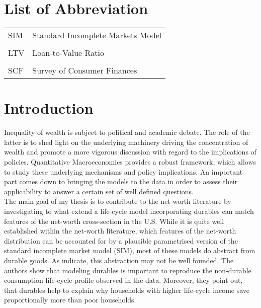 \documentclass[a4paper,12pt,legno]{article}
\begin{document}
 \newpage
\thispagestyle{empty}
\listoffigures

 \newpage
 
	\thispagestyle{empty}
	\section*{List of Abbreviation}
	
	\begin{table}[!htbp]
		\centering
	\begin{flushleft}  
	   \begin{tabular}{ll}
	    SIM   & Standard Incomplete Markets Model \\ \\
	    LTV   & Loan-to-Value Ratio \\ \\
	    SCF	  & Survey of Consumer Finances \\
	    \end{tabular}%
	\end{flushleft}
	\end{table}%
	\newpage



\setcounter{page}{1}        %


\section{Introduction}
\label{Introduction}

Inequality of wealth is subject to political and academic debate. The role of the latter is to shed light on the underlying machinery driving the concentration of wealth and promote a more vigorous discussion with regard to the implications of policies. Quantitative Macroeconomics provides a robust framework, which allows to study these underlying mechanisms and policy implications. An important part comes down to bringing the models to the data in order to assess their applicability to answer a certain set of well defined questions. \\
The main goal of my thesis is to contribute to the net-worth literature by investigating to what extend a life-cycle model incorporating durables can match features of the net-worth cross-section in the U.S. While it is quite well established within the net-worth literature, which features of the net-worth distribution can be accounted for by a plausible parametrised version of the standard incomplete market model (SIM), most of these models do abstract from durable goods. As \cite{FV&K2011}  indicate, this abstraction may not be well founded. The authors show that modeling durables is important to reproduce the non-durable consumption life-cycle profile observed in the data. Moreover, they point out, that durables help to explain why households with higher life-cycle income save proportionally more than poor households.\\
\end{document}
